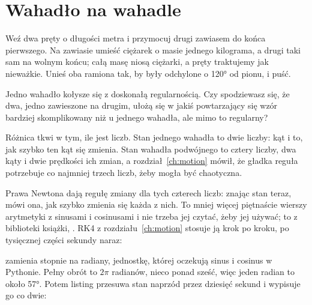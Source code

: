 \section{Wahadło na wahadle}
\label{sec:ch13-double}

\noindent
Weź dwa pręty o długości metra i przymocuj drugi zawiasem do końca
pierwszego. Na zawiasie umieść ciężarek o masie jednego kilograma, a drugi
taki sam na wolnym końcu; całą masę niosą ciężarki, a pręty traktujemy jak
nieważkie. Unieś oba ramiona tak, by były odchylone o 120° od pionu, i puść.

\begin{think}
Jedno wahadło kołysze się z doskonałą regularnością. Czy spodziewasz się, że
dwa, jedno zawieszone na drugim, ułożą się w jakiś powtarzający się wzór
\dash{} bardziej skomplikowany niż u jednego wahadła, ale mimo to regularny?
\end{think}
Różnica tkwi w tym, ile jest liczb. Stan jednego wahadła to dwie liczby: kąt i
to, jak szybko ten kąt się zmienia. Stan wahadła podwójnego to cztery liczby,
dwa kąty i dwie prędkości ich zmian, a rozdział~\ref{ch:motion} mówił, że
gładka reguła potrzebuje co najmniej trzech liczb, żeby mogła być chaotyczna.

Prawa Newtona dają regułę zmiany dla tych czterech liczb: znając stan teraz,
mówi ona, jak szybko zmienia się każda z nich. To mniej więcej piętnaście
wierszy arytmetyki z sinusami i cosinusami i nie trzeba jej czytać, żeby jej
używać; to  z biblioteki książki, . RK4 z
rozdziału~\ref{ch:motion} stosuje ją krok po kroku, po tysięcznej części
sekundy naraz:


\noindent
{} zamienia stopnie na radiany, jednostkę, której oczekują
sinus i cosinus w Pythonie. Pełny obrót to $2\pi$ radianów, nieco ponad sześć,
więc jeden radian to około 57°. Potem listing przesuwa stan naprzód przez
dziesięć sekund i wypisuje go co dwie:



